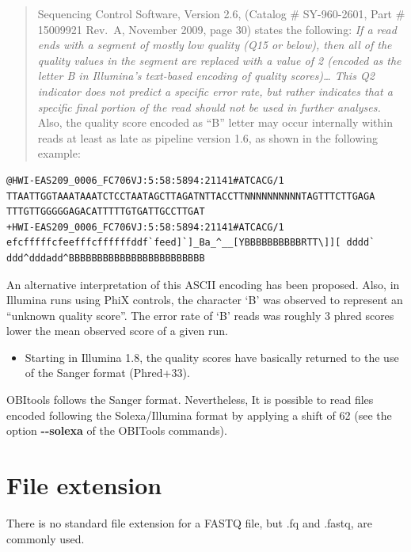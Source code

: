 \documentclass[
  letterpaper,
  DIV=11,
  numbers=noendperiod]{scrreprt}
\providecommand{\tightlist}{%
  \setlength{\itemsep}{0pt}\setlength{\parskip}{0pt}}\usepackage{longtable,booktabs,array}
\begin{document}
\begin{quote}
Sequencing Control Software, Version 2.6, (Catalog \# SY-960-2601, Part
\# 15009921 Rev.~A, November 2009, page 30) states the following:
\emph{If a read ends with a segment of mostly low quality (Q15 or
below), then all of the quality values in the segment are replaced with
a value of 2 (encoded as the letter B in Illumina's text-based encoding
of quality scores)\ldots{} This Q2 indicator does not predict a specific
error rate, but rather indicates that a specific final portion of the
read should not be used in further analyses.} Also, the quality score
encoded as ``B'' letter may occur internally within reads at least as
late as pipeline version 1.6, as shown in the following example:
\end{quote}

\begin{verbatim}
@HWI-EAS209_0006_FC706VJ:5:58:5894:21141#ATCACG/1
TTAATTGGTAAATAAATCTCCTAATAGCTTAGATNTTACCTTNNNNNNNNNNTAGTTTCTTGAGA
TTTGTTGGGGGAGACATTTTTGTGATTGCCTTGAT
+HWI-EAS209_0006_FC706VJ:5:58:5894:21141#ATCACG/1
efcfffffcfeefffcffffffddf`feed]`]_Ba_^__[YBBBBBBBBBBRTT\]][ dddd`
ddd^dddadd^BBBBBBBBBBBBBBBBBBBBBBBB
\end{verbatim}

An alternative interpretation of this ASCII encoding has been proposed.
Also, in Illumina runs using PhiX controls, the character `B' was
observed to represent an ``unknown quality score''. The error rate of
`B' reads was roughly 3 phred scores lower the mean observed score of a
given run.

\begin{itemize}
\tightlist
\item
  Starting in Illumina 1.8, the quality scores have basically returned
  to the use of the Sanger format (Phred+33).
\end{itemize}

OBItools follows the Sanger format. Nevertheless, It is possible to read
files encoded following the Solexa/Illumina format by applying a shift
of 62 (see the option \textbf{-\/-solexa} of the OBITools commands).

\hypertarget{file-extension}{%
\section{File extension}\label{file-extension}}

There is no standard file extension for a FASTQ file, but .fq and
.fastq, are commonly used.
\end{document}
